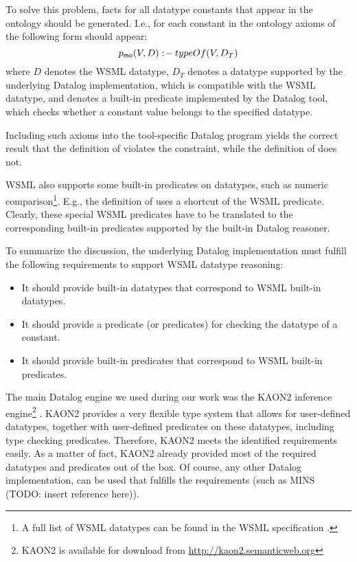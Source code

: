 To solve this problem, \pmo facts for all datatype constants that
appear in the ontology should be generated. I.e., for each
constant in the ontology axioms of the following form should
appear:
\begin{displaymath}
    \pmo(V,D) \wsml{\lprl} \typeof(V, D_T)
\end{displaymath} where $D$ denotes the WSML datatype, $D_T$ denotes a datatype supported by the underlying Datalog implementation, which is compatible with the WSML datatype, and \typeof denotes a built-in predicate implemented by the Datalog tool, which checks whether a constant value belongs to the specified datatype.

Including such axioms into the tool-specific Datalog program
yields the correct result that the definition of 
violates the  constraint, while the definition of
 does not.

WSML also supports some built-in predicates on datatypes, such as
numeric comparison\footnote{A full list of WSML datatypes can be
found in the WSML specification \cite{wsml-spec}.}. E.g., the
definition of  uses a shortcut of the WSML
 predicate. Clearly, these special WSML
predicates have to be translated to the corresponding built-in
predicates supported by the built-in Datalog reasoner.

To summarize the discussion, the underlying Datalog implementation
must fulfill the following requirements to support WSML datatype
reasoning:
\begin{itemize}
    \item It should provide built-in datatypes that correspond to WSML built-in datatypes.
    \item It should provide a predicate (or predicates) for checking the datatype of a constant.
    \item It should provide built-in predicates that correspond to WSML built-in predicates.
\end{itemize}

The main Datalog engine we used during our work was the KAON2
inference engine\footnote{KAON2 is available for download from
\url{http://kaon2.semanticweb.org}} \cite{hustadt04reducing}.
KAON2 provides a very flexible type system that allows for
user-defined datatypes, together with user-defined predicates on
these datatypes, including type checking predicates. Therefore,
KAON2 meets the identified requirements easily. As a matter of
fact, KAON2 already provided most of the required datatypes and
predicates out of the box. Of course, any other Datalog
implementation, can be used that fulfills the requirements (such
as MINS (TODO: insert reference here)).
